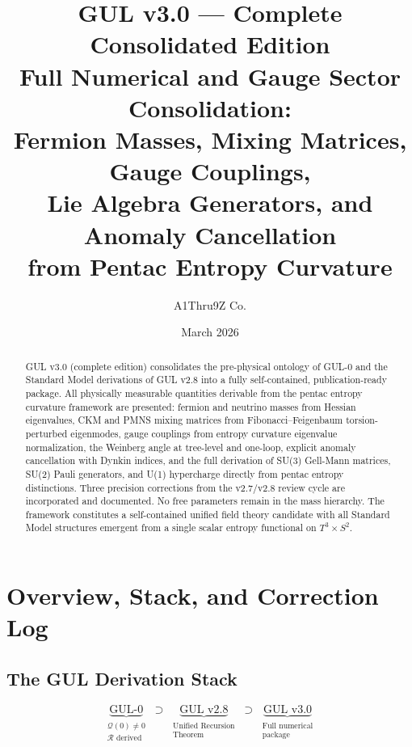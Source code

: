 \documentclass[11pt]{article}
\title{%
  GUL v3.0 --- Complete Consolidated Edition\\[4pt]
  \large Full Numerical and Gauge Sector Consolidation:\\
  Fermion Masses, Mixing Matrices, Gauge Couplings,\\
  Lie Algebra Generators, and Anomaly Cancellation\\
  from Pentac Entropy Curvature
}
\author{A1Thru9Z Co.}
\date{March 2026}
\begin{document}
\maketitle

\begin{abstract}
GUL v3.0 (complete edition) consolidates the pre-physical ontology
of GUL-0 and the Standard Model derivations of GUL v2.8 into a
fully self-contained, publication-ready package. All physically
measurable quantities derivable from the pentac entropy curvature
framework are presented: fermion and neutrino masses from Hessian
eigenvalues, CKM and PMNS mixing matrices from Fibonacci--Feigenbaum
torsion-perturbed eigenmodes, gauge couplings from entropy curvature
eigenvalue normalization, the Weinberg angle at tree-level and
one-loop, explicit anomaly cancellation with Dynkin indices, and
the full derivation of SU(3) Gell-Mann matrices, SU(2) Pauli
generators, and U(1) hypercharge directly from pentac entropy
distinctions. Three precision corrections from the v2.7/v2.8 review
cycle are incorporated and documented. No free parameters remain in
the mass hierarchy. The framework constitutes a self-contained
unified field theory candidate with all Standard Model structures
emergent from a single scalar entropy functional on $T^3\times S^2$.
\end{abstract}

\tableofcontents
\newpage

\section{Overview, Stack, and Correction Log}
\label{sec:overview}

\subsection{The GUL Derivation Stack}

\begin{equation}
  \underbrace{\text{GUL-0}}_{\substack{\mathcal{Q}(0)\neq0 \\ \mathcal{R}\text{ derived}}}
  \;\supset\;
  \underbrace{\text{GUL v2.8}}_{\substack{\text{Unified Recursion}\\\text{Theorem}}}
  \;\supset\;
  \underbrace{\text{GUL v3.0}}_{\substack{\text{Full numerical}\\\text{package}}}
\end{equation}
\end{document}
